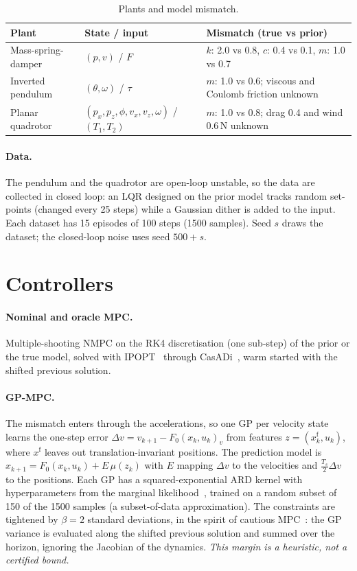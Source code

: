 \documentclass[11pt,a4paper]{article}
\begin{document}
\begin{table}[h]
\centering
\caption{Plants and model mismatch.}
\label{tab:plants}
\small
\begin{tabular}{llp{6.2cm}}
\toprule
Plant & State / input & Mismatch (true vs prior) \\
\midrule
Mass-spring-damper & $(p,v)$ / $F$ & $k$: 2.0 vs 0.8, $c$: 0.4 vs 0.1, $m$: 1.0 vs 0.7 \\
Inverted pendulum & $(\theta,\omega)$ / $\tau$ & $m$: 1.0 vs 0.6; viscous and Coulomb friction unknown \\
Planar quadrotor & $(p_x,p_z,\phi,v_x,v_z,\omega)$ / $(T_1,T_2)$ & $m$: 1.0 vs 0.8; drag 0.4 and wind 0.6\,N unknown \\
\bottomrule
\end{tabular}
\end{table}

\paragraph{Data.} The pendulum and the quadrotor are open-loop unstable, so the
data are collected in closed loop: an LQR designed on the prior model tracks
random set-points (changed every 25 steps) while a Gaussian dither is added to
the input. Each dataset has 15 episodes of 100 steps (1500 samples). Seed $s$
draws the dataset; the closed-loop noise uses seed $500+s$.

\section{Controllers}
\paragraph{Nominal and oracle MPC.} Multiple-shooting NMPC on the RK4
discretisation (one sub-step) of the prior or the true model, solved with
IPOPT~\cite{wachter2006ipopt} through CasADi~\cite{andersson2019casadi}, warm
started with the shifted previous solution.

\paragraph{GP-MPC.} The mismatch enters through the accelerations, so one GP
per velocity state learns the one-step error
$\Delta v = v_{k+1} - F_0(x_k,u_k)_v$ from features $z=(x_k^{\mathrm{f}},u_k)$,
where $x^{\mathrm{f}}$ leaves out translation-invariant positions. The prediction
model is $x_{k+1} = F_0(x_k,u_k) + E\,\mu(z_k)$ with $E$ mapping $\Delta v$ to
the velocities and $\tfrac{T_s}{2}\Delta v$ to the positions. Each GP has a
squared-exponential ARD kernel with hyperparameters from the marginal
likelihood~\cite{rasmussen2006gpml}, trained on a random subset of 150 of the
1500 samples (a subset-of-data approximation). The constraints are tightened
by $\beta=2$ standard deviations, in the spirit of cautious
MPC~\cite{hewing2020cautious}: the GP variance is evaluated along the shifted
previous solution and summed over the horizon, ignoring the Jacobian of the
dynamics. \emph{This margin is a heuristic, not a certified bound.}
\end{document}
